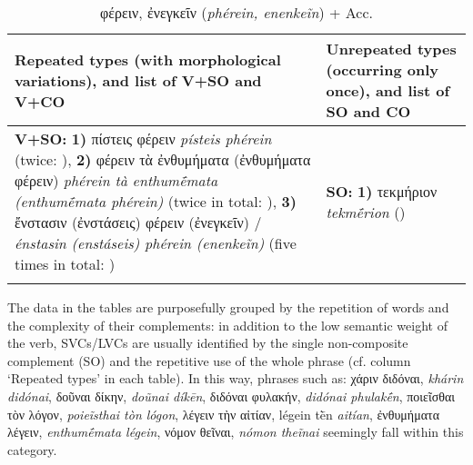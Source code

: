 \documentclass[output=paper,colorlinks,citecolor=brown]{langscibook}
\begin{document}
\begin{table}
\footnotesize
\begin{tabularx}{\textwidth}{QQ}
        \lsptoprule
        Repeated types (with morphological variations), and list of V+SO and V+CO & Unrepeated types (occurring only once), and list of SO and CO     \\
        \midrule
        \textbf{V+SO:} \newline
        \textbf{1)} πίστεις φέρειν \textit{písteis phérein} (twice: ),\newline
        \textbf{2)} φέρειν τὰ ἐνθυμήματα (ἐνθυμήματα φέρειν) \textit{phérein tà enthumḗmata (enthumḗmata phérein)} (twice in total: ),\newline
        \textbf{3)} ἔνστασιν (ἐνστάσεις) φέρειν (ἐνεγκεῖν) / \textit{énstasin (enstáseis) phérein (enenkeĩn)} (five times in total: )
        &
        \textbf{SO:} \newline
        \textbf{1)} τεκμήριον \textit{tekmḗrion} ()\\
        \lspbottomrule
\end{tabularx}
\caption{{φέρειν, ἐνεγκεῖν (\textit{phérein, enenkeĩn})} + Acc.}
\label{tab:endexampledata}
\end{table}




The data in the tables are purposefully grouped by the repetition of words and the complexity of their complements: in addition to the low semantic weight of the verb, SVCs/LVCs are usually identified by the single non-composite complement (SO) and the repetitive use of the whole phrase (cf. column ‘Repeated types' in each table). In this way, phrases such as: χάριν διδόναι, \textit{khárin didónai}, δοῦναι δίκην, \textit{doũnai díkēn}, διδόναι φυλακήν, \textit{ didónai phulakḗn}, ποιεῖσθαι τὸν λόγον, \textit{poieĩsthai tòn lógon}, λέγειν τὴν αἰτίαν, légein tḕn \textit{aitían}, ἐνθυμήματα λέγειν, \textit{enthumḗmata légein}, νόμον θεῖναι, \textit{nómon theĩnai}
seemingly fall within this category. 
\end{document}
